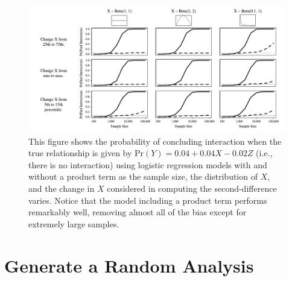 \documentclass[12pt]{article}
\begin{document}
\begin{appendix}
\begin{figure}[H]
\begin{center}
\includegraphics[scale = .8]{fig/fig-fixed-few1s.pdf}
\end{center}\caption{This figure shows the probability of concluding interaction when the true relationship is given by $\text{Pr}(Y) = 0.04 + 0.04X - 0.02Z$ (i.e., there is no interaction) using logistic regression models with and without a product term as the sample size, the distribution of $X$, and the change in $X$ considered in computing the second-difference varies. Notice that the model including a product term performs remarkably well, removing almost all of the bias except for extremely large samples. }\label{fig:fixed-few1s}
\end{figure}

\section*{Generate a Random Analysis}


\end{appendix}
\end{document}

